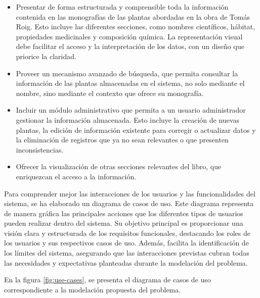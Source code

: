 \begin{itemize}
    \item Presentar de forma estructurada y comprensible toda la información contenida 
    en las monografías de las plantas abordadas en la obra de Tomás Roig. Esto incluye las diferentes secciones, 
    como nombres científicos, hábitat, propiedades medicinales y composición química. 
    La representación visual debe facilitar el acceso y la interpretación de los datos, 
    con un diseño que priorice la claridad.
    \item Proveer un mecanismo avanzado de búsqueda, que permita consultar la información
    de las plantas almacenadas en el sistema, no solo mediante el nombre, 
    sino mediante el contexto que ofrece su monografía.
    \item Incluir un módulo administrativo que permita a un usuario administrador gestionar
    la información almacenada. Esto incluye la creación de nuevas plantas, 
    la edición de información existente para corregir o actualizar datos y la eliminación 
    de registros que ya no sean relevantes o que presenten inconsistencias.
    \item Ofrecer la visualización de otras secciones relevantes del libro, que enriquezcan el
    acceso a la información.
\end{itemize}

Para comprender mejor las interacciones de los usuarios y las funcionalidades del sistema, 
se ha elaborado un diagrama de casos de uso. Este diagrama representa de manera gráfica 
las principales acciones que los diferentes tipos de usuarios pueden realizar dentro del sistema. 
Su objetivo principal es proporcionar una visión clara y estructurada de los requisitos funcionales, 
destacando los roles de los usuarios y sus respectivos casos de uso. Además, facilita la 
identificación de los límites del sistema, asegurando que las interacciones previstas cubran 
todas las necesidades y expectativas planteadas durante la modelación del problema.

En la figura \ref{fig:use-cases}, se presenta el diagrama de casos de uso correspondiente a la modelación 
propuesta del problema.

